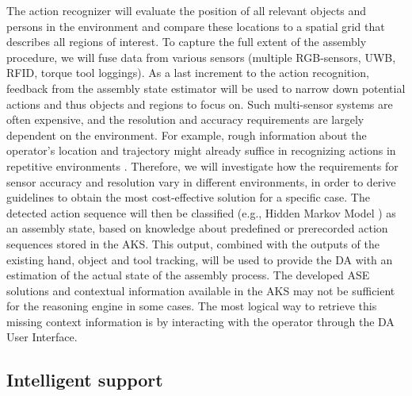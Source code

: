 The action recognizer will evaluate the position of all relevant objects and persons in the environment and compare these locations to a spatial grid that describes all regions of interest. To capture the full extent of the assembly procedure, we will fuse data from various sensors (multiple RGB-sensors, UWB, RFID, torque tool loggings). As a last increment to the action recognition, feedback from the assembly state estimator will be used to narrow down potential actions and thus objects and regions to focus on. Such multi-sensor systems are often expensive, and the resolution and accuracy requirements are largely dependent on the environment. For example, rough information about the operator's location and trajectory might already suffice in recognizing actions in repetitive environments \cite{bauters2018AutomatedWorkCycle}. Therefore, we will investigate how the requirements for sensor accuracy and resolution vary in different environments, in order to derive guidelines to obtain the most cost-effective solution for a specific case. The detected action sequence will then be classified (e.g., Hidden Markov Model \cite{cramer2018RobustIntentionEstimation}) as an assembly state, based on knowledge about predefined or prerecorded action sequences stored in the AKS. This output, combined with the outputs of the existing hand, object and tool tracking, will be used to provide the DA with an estimation of the actual state of the assembly process. The developed ASE solutions and contextual information available in the AKS may not be sufficient for the reasoning engine in some cases. The most logical way to retrieve this missing context information is by interacting with the operator through the DA User Interface.

\subsection{Intelligent support}

